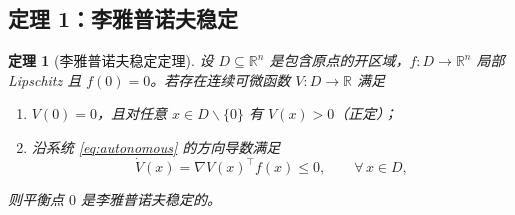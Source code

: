 \documentclass[11pt, a4paper, UTF8, fontset=none]{ctexart}
\theoremstyle{cnthm}
\newtheorem{theorem}{定理}[section]
\newcommand{\R}{\mathbb{R}}
\begin{document}
\subsection{定理 1：李雅普诺夫稳定}

\begin{theorem}[李雅普诺夫稳定定理]
\label{thm:stable}
设 $D\subseteq\R^n$ 是包含原点的开区域，$f:D\to\R^n$ 局部 Lipschitz 且 $f(0)=0$。若存在连续可微函数 $V:D\to\R$ 满足
\begin{enumerate}[label=(\roman*)]
  \item $V(0)=0$，且对任意 $x\in D\backslash\{0\}$ 有 $V(x)>0$（正定）；
  \item 沿系统 \eqref{eq:autonomous} 的方向导数满足
  \begin{equation}
    \dot V(x)=\nabla V(x)^\top f(x)\le0,\qquad \forall\,x\in D,
    \label{eq:stable-condition}
  \end{equation}
\end{enumerate}
则平衡点 $0$ 是李雅普诺夫稳定的。
\end{theorem}
\end{document}
